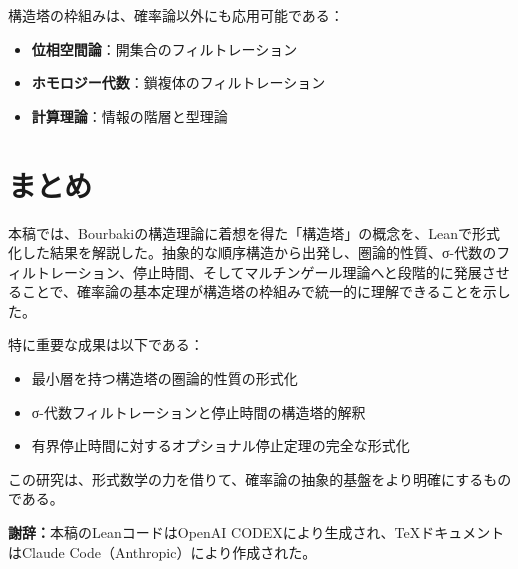 \documentclass[a4paper,12pt]{article}
\theoremstyle{definition}
\begin{document}
構造塔の枠組みは、確率論以外にも応用可能である：

\begin{itemize}
\item \textbf{位相空間論}：開集合のフィルトレーション
\item \textbf{ホモロジー代数}：鎖複体のフィルトレーション
\item \textbf{計算理論}：情報の階層と型理論
\end{itemize}

\section{まとめ}

本稿では、Bourbakiの構造理論に着想を得た「構造塔」の概念を、Leanで形式化した結果を解説した。抽象的な順序構造から出発し、圏論的性質、σ-代数のフィルトレーション、停止時間、そしてマルチンゲール理論へと段階的に発展させることで、確率論の基本定理が構造塔の枠組みで統一的に理解できることを示した。

特に重要な成果は以下である：

\begin{itemize}
\item 最小層を持つ構造塔の圏論的性質の形式化
\item σ-代数フィルトレーションと停止時間の構造塔的解釈
\item 有界停止時間に対するオプショナル停止定理の完全な形式化
\end{itemize}

この研究は、形式数学の力を借りて、確率論の抽象的基盤をより明確にするものである。

\vspace{1em}
\noindent
\textbf{謝辞：}本稿のLeanコードはOpenAI CODEXにより生成され、TeXドキュメントはClaude Code（Anthropic）により作成された。
\end{document}
